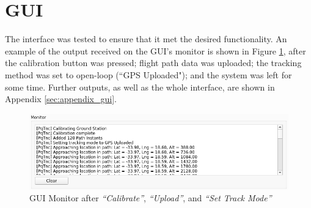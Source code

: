 \graphicspath{{./figures}}

\section{GUI}

The interface was tested to ensure that it met the desired functionality. An example of the output received on the GUI's monitor is shown in Figure \ref{fig:guiOpenLoop}, after the calibration button was pressed; flight path data was uploaded; the tracking method was set to open-loop (``GPS Uploaded"); and the system was left for some time. Further outputs, as well as the whole interface, are shown in Appendix \ref{sec:appendix_gui}.

\begin{figure}[!htb]
  \centering
  \includegraphics[width=1.0\textwidth]{guiOpenLoop}
  \caption{GUI Monitor after \textit{``Calibrate''}, \textit{``Upload''}, and \textit{``Set Track Mode''}}
  \label{fig:guiOpenLoop}
\end{figure}